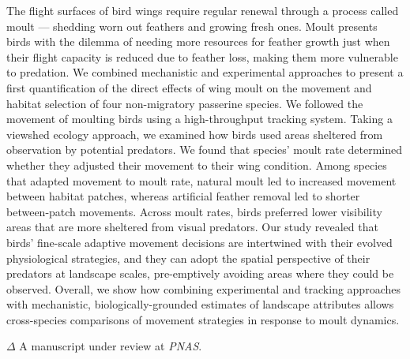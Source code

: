 \small{
    The flight surfaces of bird wings require regular renewal through a process called moult --- shedding worn out feathers and growing fresh ones.
    Moult presents birds with the dilemma of needing more resources for feather growth just when their flight capacity is reduced due to feather loss, making them more vulnerable to predation.
    We combined mechanistic and experimental approaches to present a first quantification of the direct effects of wing moult on the movement and habitat selection of four non-migratory passerine species. 
    We followed the movement of moulting birds using a high-throughput tracking system. 
    Taking a viewshed ecology approach, we examined how birds used areas sheltered from observation by potential predators.
    We found that species' moult rate determined whether they adjusted their movement to their wing condition.
    Among species that adapted movement to moult rate, natural moult led to increased movement between habitat patches, whereas artificial feather removal led to shorter between-patch movements. 
    Across moult rates, birds preferred lower visibility areas that are more sheltered from visual predators.
    Our study revealed that birds' fine-scale adaptive movement decisions are intertwined with their evolved physiological strategies, and they can adopt the spatial perspective of their predators at landscape scales, pre-emptively avoiding areas where they could be observed.
    Overall, we show how combining experimental and tracking approaches with mechanistic, biologically-grounded estimates of landscape attributes allows cross-species comparisons of movement strategies in response to moult dynamics.

    \bigskip

    {\noindent \large{$\Delta$}} \normalfont A manuscript under review at \textit{PNAS}.

}

\clearpage
